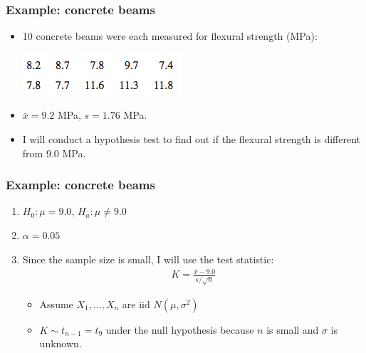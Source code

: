 \documentclass[handout]{beamer}\usepackage{graphicx, color}
\providecommand{\ov}[1]{\overline{#1}}
\numberwithin{equation}{section}
\begin{document}
\begin{frame}
\frametitle{Example: concrete beams}
\begin{itemize}
\item 10 concrete beams were each measured for flexural strength (MPa):
\pause \begin{center}
 \includegraphics{../../fig/fbeams.png}
\end{center}
\pause \item $\ov{x} = 9.2$ MPa, $s = 1.76$ MPa.
\pause \item I will conduct a hypothesis test to find out if the flexural strength is different from 9.0 MPa.
\end{itemize}
\end{frame}


\begin{frame}
\frametitle{Example: concrete beams}
\begin{enumerate}[1. ]
\item  $H_0: \mu = 9.0$, $H_a: \mu \ne 9.0$
\pause \item $\alpha = 0.05$
\pause \item Since the sample size is small, I will use the test statistic:
\begin{align*}
K = \frac{\ov{x} - 9.0}{s/\sqrt{n}}
\end{align*}
\begin{itemize}
\pause \item Assume $X_1, \ldots, X_n$ are iid $N(\mu, \sigma^2)$
\pause \item $K \sim t_{n - 1} = t_{9}$ under the null hypothesis because $n$ is small and $\sigma$ is unknown.
\end{itemize}
\end{enumerate}
\end{frame}
\end{document}
